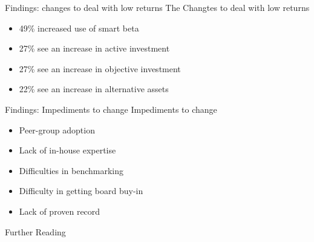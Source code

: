 \documentclass[14pt,xcolor=pdftex,dvipsnames,table]{beamer}\usepackage[]{graphicx}\usepackage[]{color}
\begin{document}
\begin{frame}{Findings: changes to deal with low returns}
The Changtes to deal with low returns
\begin{itemize}[<+-| alert@+>]
\pause
\item 49\% increased use of smart beta
\item 27\% see an increase in active investment
\item 27\% see an increase in objective investment
\item 22\% see an increase in alternative assets
\end{itemize}
\end{frame}

\begin{frame}{Findings: Impediments to change}
Impediments to change
\begin{itemize}[<+-| alert@+>]
\pause
\item Peer-group adoption
\item Lack of in-house expertise
\item Difficulties in benchmarking
\item Difficulty in getting board buy-in
\item Lack of proven record
\end{itemize}
\end{frame}

\begin{frame}{Further Reading}
\end{frame}
\end{document}
